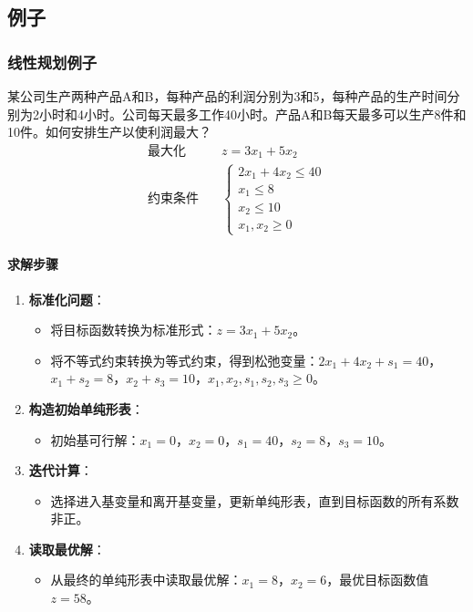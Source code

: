 \documentclass[UTF8]{ctexart}
\begin{document}
\subsection {例子}
\subsubsection {线性规划例子}
某公司生产两种产品A和B，每种产品的利润分别为3和5，每种产品的生产时间分别为2小时和4小时。公司每天最多工作40小时。产品A和B每天最多可以生产8件和10件。如何安排生产以使利润最大？
\[
\begin{aligned}
\text{最大化} & \quad z = 3x_1 + 5x_2 \\
\text{约束条件} & \quad 
\begin{cases}
2x_1 + 4x_2 \leq 40 \\
x_1 \leq 8 \\
x_2 \leq 10 \\
x_1, x_2 \geq 0
\end{cases}
\end{aligned}
\]

\paragraph{求解步骤}
\begin{enumerate}
    \item \textbf{标准化问题}：
        \begin{itemize}
            \item 将目标函数转换为标准形式：\( z = 3x_1 + 5x_2 \)。
            \item 将不等式约束转换为等式约束，得到松弛变量：\( 2x_1 + 4x_2 + s_1 = 40 \)，\( x_1 + s_2 = 8 \)，\( x_2 + s_3 = 10 \)，\( x_1, x_2, s_1, s_2, s_3 \geq 0 \)。
        \end{itemize}
    \item \textbf{构造初始单纯形表}：
        \begin{itemize}
            \item 初始基可行解：\( x_1 = 0 \)，\( x_2 = 0 \)，\( s_1 = 40 \)，\( s_2 = 8 \)，\( s_3 = 10 \)。
        \end{itemize}
    \item \textbf{迭代计算}：
        \begin{itemize}
            \item 选择进入基变量和离开基变量，更新单纯形表，直到目标函数的所有系数非正。
        \end{itemize}
    \item \textbf{读取最优解}：
        \begin{itemize}
            \item 从最终的单纯形表中读取最优解：\( x_1 = 8 \)，\( x_2 = 6 \)，最优目标函数值 \( z = 58 \)。
        \end{itemize}
\end{enumerate}
\end{document}
